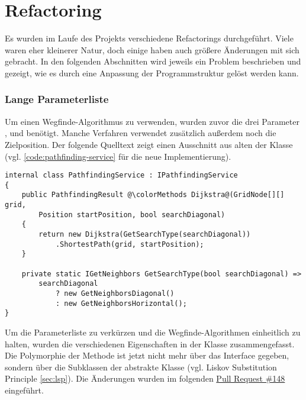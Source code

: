 \part{Refactoring}
Es wurden im Laufe des Projekts verschiedene Refactorings durchgeführt.
Viele waren eher kleinerer Natur, doch einige haben auch größere Änderungen
mit sich gebracht.
In den folgenden Abschnitten wird jeweils ein Problem beschrieben und
gezeigt, wie es durch eine Anpassung der Programmstruktur gelöst werden kann.

\section{Lange Parameterliste}
Um einen Wegfinde-Algorithmus zu verwenden, wurden zuvor die
drei Parameter ,  und
 benötigt. Manche Verfahren verwendet zusätzlich außerdem
noch die Zielposition. Der folgende Quelltext zeigt einen Ausschnitt aus alten der
 Klasse
(vgl. \autoref{code:pathfinding-service} für die neue Implementierung).
\begin{lstlisting}[caption={Die alte \lstinline{PathfindingService} Klasse},
    label={code:use-pathfinding}]
internal class PathfindingService : IPathfindingService
{
    public PathfindingResult @\colorMethods Dijkstra@(GridNode[][] grid,
        Position startPosition, bool searchDiagonal)
    {
        return new Dijkstra(GetSearchType(searchDiagonal))
            .ShortestPath(grid, startPosition);
    }

    private static IGetNeighbors GetSearchType(bool searchDiagonal) =>
        searchDiagonal
            ? new GetNeighborsDiagonal()
            : new GetNeighborsHorizontal();
}
\end{lstlisting}
Um die Parameterliste zu verkürzen und die Wegfinde-Algorithmen
einheitlich zu halten, wurden die verschiedenen Eigenschaften in der Klasse
 zusammengefasst.
Die Polymorphie der  Methode
ist jetzt nicht mehr über das Interface 
gegeben, sondern über die Subklassen der abstrakte Klasse
 (vgl. Liskov Substitution Principle \ref{sec:lsp}).
Die Änderungen wurden im folgenden
\href{https://github.com/JensDll/pathfinding-visualization/pull/148}{Pull Request \#148}
eingeführt.

